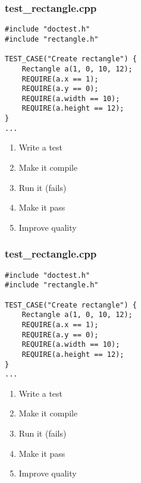 \begin{frame}[fragile]
\frametitle{test\_rectangle.cpp}
\begin{minipage}[t]{0.48\linewidth}
\begin{lstlisting}
#include "doctest.h"
#include "rectangle.h"

TEST_CASE("Create rectangle") {
    Rectangle a(1, 0, 10, 12);
    REQUIRE(a.x == 1);
    REQUIRE(a.y == 0);
    REQUIRE(a.width == 10);
    REQUIRE(a.height == 12);
}
...
\end{lstlisting}
\end{minipage}\hfill
\begin{minipage}[t]{0.28\linewidth}
  \small
  \begin{enumerate} 
    \item \textcolor{activecolor}{Write a test}
    \item \textcolor{deadcolor}{Make it compile}
    \item \textcolor{deadcolor}{Run it (fails)}
    \item \textcolor{deadcolor}{Make it pass}
    \item \textcolor{deadcolor}{Improve quality}
  \end{enumerate} 
\end{minipage}
\end{frame}

\begin{frame}[fragile]
\frametitle{test\_rectangle.cpp}
\begin{minipage}[t]{0.48\linewidth}
\begin{lstlisting}
#include "doctest.h"
#include "rectangle.h"

TEST_CASE("Create rectangle") {
    Rectangle a(1, 0, 10, 12);
    REQUIRE(a.x == 1);
    REQUIRE(a.y == 0);
    REQUIRE(a.width == 10);
    REQUIRE(a.height == 12);
}
...
\end{lstlisting}
\end{minipage}\hfill
\begin{minipage}[t]{0.28\linewidth}
  \small
  \begin{enumerate} 
    \item \textcolor{deadcolor}{Write a test}
    \item \textcolor{activecolor}{Make it compile}
    \item \textcolor{deadcolor}{Run it (fails)}
    \item \textcolor{deadcolor}{Make it pass}
    \item \textcolor{deadcolor}{Improve quality}
  \end{enumerate} 
\end{minipage}
\end{frame}

